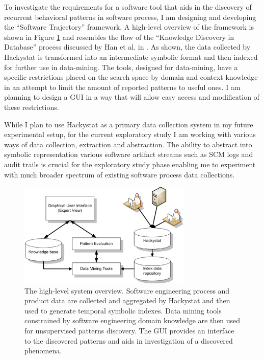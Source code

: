 \documentclass{sig-alternate}
\begin{document}
To investigate the requirements for a software tool that aids in the discovery of recurrent behavioral patterns in software process, I am designing and developing the ``Software Trajectory'' framework. A high-level overview of the framework is shown in Figure \ref{fig:system_overview} and resembles the flow of the ``Knowledge Discovery in Database'' process discussed by Han et al. in \cite{citeulike:709476}. As shown, the data collected by Hackystat is transformed into an intermediate symbolic format and then indexed for further use in data-mining. The tools, designed for data-mining, have a specific restrictions placed on the search space by domain and context knowledge in an attempt to limit the amount of reported patterns to useful ones. I am planning to design a GUI in a way that will allow easy access and modification of these restrictions.

While I plan to use Hackystat as a primary data collection system in my future experimental setup, for the current exploratory study I am working with various ways of data collection, extraction and abstraction. The ability to abstract into symbolic representation various software artifact streams such as SCM logs and audit trails is crucial for the exploratory study phase enabling me to experiment with much broader spectrum of existing software process data collections.

\begin{figure}[tbp]
   \centering
   \includegraphics[height=50mm]{system_overview.eps}
   \caption{The high-level system overview. Software engineering process and product data are collected and aggregated by Hackystat and then used to generate temporal symbolic indexes. Data mining tools constrained by software engineering domain knowledge are then used for unsupervised patterns discovery. The GUI provides an interface to the discovered patterns and aids in investigation of a discovered phenomena.}
   \label{fig:system_overview}
\end{figure}
 
\end{document}
